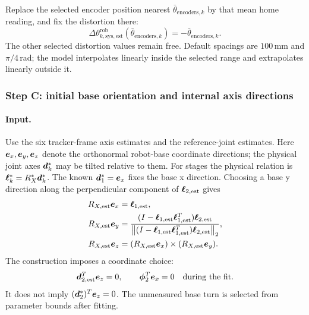 \documentclass[../main.tex]{subfiles}
\begin{document}
Replace the selected encoder position nearest $\bar\theta_{\mathrm{encoders},k}$ by that mean home reading, and fix the distortion there:
\begin{equation*}
\Delta\theta^{\mathrm{rob}}_{k,\mathrm{sys},\mathrm{est}}(\bar\theta_{\mathrm{encoders},k})=-\bar\theta_{\mathrm{encoders},k}.
\end{equation*}
The other selected distortion values remain free. Default spacings are $100$\,mm and $\pi/4$\,rad; the model interpolates linearly inside the selected range and extrapolates linearly outside it.

\subsubsection{Step C: initial base orientation and internal axis directions}\label{sec:math-base-init}
\paragraph{Input.}
Use the six tracker-frame axis estimates and the reference-joint estimates. Here $\bm{e}_x,\bm{e}_y,\bm{e}_z$ denote the orthonormal robot-base coordinate directions; the physical joint axes $\bm{d}_k^*$ may be tilted relative to them. For stages the physical relation is $\bm{\ell}_k^*=R_X^*\bm{d}_k^*$. The known $\bm{d}_1^*=\bm{e}_x$ fixes the base x direction. Choosing a base y direction along the perpendicular component of $\bm{\ell}_{2,\mathrm{est}}$ gives
\begin{equation*}
\begin{aligned}
R_{X,\mathrm{est}}\bm{e}_x&=\bm{\ell}_{1,\mathrm{est}},\\
R_{X,\mathrm{est}}\bm{e}_y&=
\frac{(I-\bm{\ell}_{1,\mathrm{est}}\bm{\ell}_{1,\mathrm{est}}^T)\bm{\ell}_{2,\mathrm{est}}}
{\left\|(I-\bm{\ell}_{1,\mathrm{est}}\bm{\ell}_{1,\mathrm{est}}^T)\bm{\ell}_{2,\mathrm{est}}\right\|_2},\\
R_{X,\mathrm{est}}\bm{e}_z&=(R_{X,\mathrm{est}}\bm{e}_x)\times(R_{X,\mathrm{est}}\bm{e}_y).
\end{aligned}
\end{equation*}
The construction imposes a coordinate choice:
\begin{equation*}
\bm{d}_{2,\mathrm{est}}^T\bm{e}_z=0,\qquad
\bm{\phi}_2^T\bm{e}_x=0\quad\text{during the fit}.
\end{equation*}
It does not imply $(\bm{d}_2^*)^T\bm{e}_z=0$. The unmeasured base turn is selected from parameter bounds after fitting.
\end{document}
